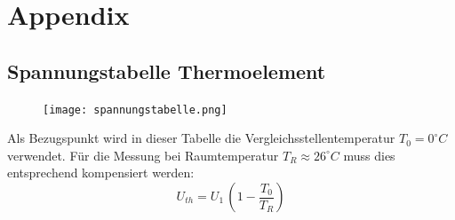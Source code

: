 \documentclass[a4paper]{scrartcl}
\begin{document}
\newpage
\section{Appendix}
\subsection{Spannungstabelle Thermoelement}
\label{Kacktabelle}
\begin{figure}[htbp]
\centering
\texttt{[image: spannungstabelle.png]}
\label{temp_cool}
\end{figure}
%
Als Bezugspunkt wird in dieser Tabelle die Vergleichsstellentemperatur $T_{0}=0^{\circ}C$ verwendet. Für die Messung bei Raumtemperatur $T_{R} \approx 26^{\circ}C$ muss dies entsprechend kompensiert werden:
$$ U_{th} = U_{1} \, (1-\frac{T_{0}}{T_{R}}) $$
\end{document}

